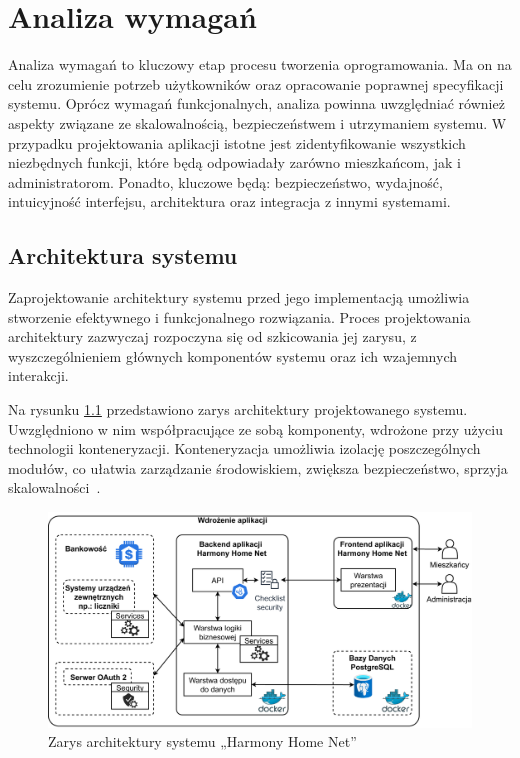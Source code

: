 \chapter{Analiza wymagań}
Analiza wymagań to kluczowy etap procesu tworzenia oprogramowania. Ma on na celu zrozumienie potrzeb użytkowników oraz opracowanie poprawnej specyfikacji systemu. Oprócz wymagań funkcjonalnych, analiza powinna uwzględniać również aspekty związane ze skalowalnością, bezpieczeństwem i utrzymaniem systemu. W przypadku projektowania aplikacji istotne jest zidentyfikowanie wszystkich niezbędnych funkcji, które będą odpowiadały zarówno mieszkańcom, jak i administratorom. Ponadto, kluczowe będą: bezpieczeństwo, wydajność, intuicyjność interfejsu, architektura oraz integracja z innymi systemami.

\section{Architektura systemu} 
Zaprojektowanie architektury systemu przed jego implementacją umożliwia stworzenie efektywnego i funkcjonalnego rozwiązania. Proces projektowania architektury zazwyczaj rozpoczyna się od szkicowania jej zarysu, z wyszczególnieniem głównych komponentów systemu oraz ich wzajemnych interakcji. 

Na rysunku \ref{fig:zarys_architektury} przedstawiono zarys architektury projektowanego systemu. Uwzględniono w nim współpracujące ze sobą komponenty, wdrożone przy użyciu technologii konteneryzacji. Konteneryzacja umożliwia izolację poszczególnych modułów, co ułatwia zarządzanie środowiskiem, zwiększa bezpieczeństwo, sprzyja skalowalności~\cite{Docker-docs,vsupalov}.
\begin{figure}[ht]
    \centering
    \includegraphics[width=.9\linewidth]{rys02/zarys_architektury}
    \caption{Zarys architektury systemu „Harmony Home Net”}
    \label{fig:zarys_architektury}
\end{figure}

